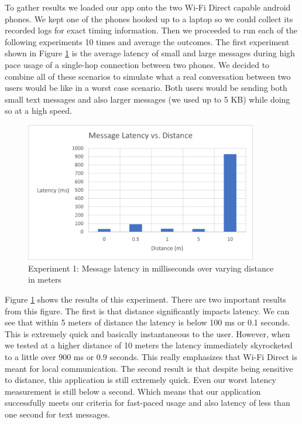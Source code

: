 \documentclass[10pt]{article}
\begin{document}
To gather results we loaded our app onto the two Wi-Fi Direct capable android phones. We kept one of the phones hooked up to a laptop so we could collect its recorded logs for exact timing information. Then we proceeded to run each of the following experiments 10 times and average the outcomes. The first experiment shown in Figure \ref{results:message_latency} is the average latency of small and large messages during high pace usage of a single-hop connection between two phones. We decided to combine all of these scenarios to simulate what a real conversation between two users would be like in a worst case scenario. Both users would be sending both small text messages and also larger messages (we used up to 5 KB) while doing so at a high speed.

\begin{figure}[h!]
    \centering
    \includegraphics[width=4in]{message_latency_graph.png}
    \caption{Experiment 1: Message latency in milliseconds over varying distance in meters}
    \label{results:message_latency}
\end{figure}

Figure \ref{results:message_latency} shows the results of this experiment. There are two important results from this figure. The first is that distance significantly impacts latency. We can see that within 5 meters of distance the latency is below 100 ms or 0.1 seconds. This is extremely quick and basically instantaneous to the user. However, when we tested at a higher distance of 10 meters the latency immediately skyrocketed to a little over 900 ms or 0.9 seconds. This really emphasizes that Wi-Fi Direct is meant for local communication. The second result is that despite being sensitive to distance, this application is still extremely quick. Even our worst latency measurement is still below a second. Which means that our application successfully meets our criteria for fast-paced usage and also latency of less than one second for text messages.
\end{document}
